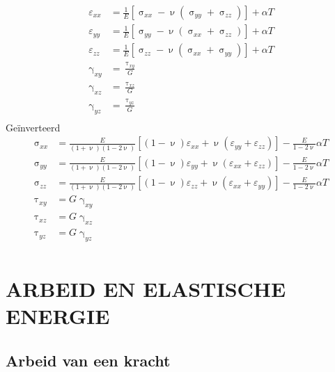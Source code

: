             \begin{align}
                \varepsilon_{xx} &= \frac{1}{E}\left[\upsigma_{xx} - \upnu\left(\upsigma_{yy}+\upsigma_{zz}\right)\right] + \alpha T\nonumber\\
                \varepsilon_{yy} &= \frac{1}{E}\left[\upsigma_{yy} - \upnu\left(\upsigma_{xx}+\upsigma_{zz}\right)\right] + \alpha T\nonumber\\
                \varepsilon_{zz} &= \frac{1}{E}\left[\upsigma_{zz} - \upnu\left(\upsigma_{xx}+\upsigma_{yy}\right)\right] + \alpha T\nonumber\\
                \upgamma_{xy} &= \frac{\uptau_{xy}}{G}\nonumber\\
                \upgamma_{xz} &= \frac{\uptau_{xz}}{G}\nonumber\\
                \upgamma_{yz} &= \frac{\uptau_{yz}}{G}\nonumber\\
            \end{align}
            Geïnverteerd
            \begin{align}
                \upsigma_{xx} &= \frac{E}{(1+\upnu)(1-2\upnu)}\left[(1-\upnu)\varepsilon_{xx}+\upnu\left(\varepsilon_{yy}+\varepsilon_{zz}\right)\right] - \frac{E}{1-2\upnu}\alpha T\nonumber\\
                \upsigma_{yy} &= \frac{E}{(1+\upnu)(1-2\upnu)}\left[(1-\upnu)\varepsilon_{yy}+\upnu\left(\varepsilon_{xx}+\varepsilon_{zz}\right)\right] - \frac{E}{1-2\upnu}\alpha T\nonumber\\
                \upsigma_{zz} &= \frac{E}{(1+\upnu)(1-2\upnu)}\left[(1-\upnu)\varepsilon_{zz}+\upnu\left(\varepsilon_{xx}+\varepsilon_{yy}\right)\right] - \frac{E}{1-2\upnu}\alpha T\nonumber\\
                \uptau_{xy} &= G\upgamma_{xy}\nonumber\\
                \uptau_{xz} &= G\upgamma_{xz}\nonumber\\
                \uptau_{yz} &= G\upgamma_{yz}\nonumber\\
            \end{align}

    \section{ARBEID EN ELASTISCHE ENERGIE}

        \subsection{Arbeid van een kracht}

